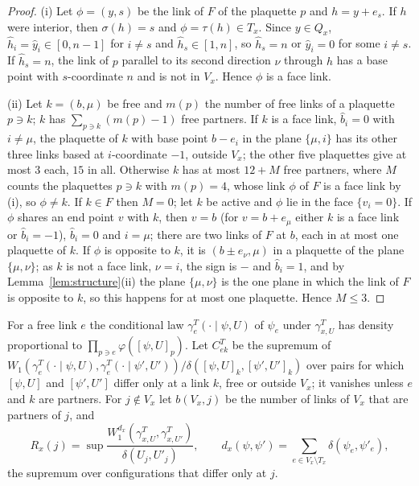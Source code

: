 \begin{proof}
(i) Let $\phi=(y,s)$ be the link of $F$ of the plaquette $p$ and $h=y+e_s$.
If $h$ were interior, then $\sigma(h)=s$ and $\phi=\tau(h)\in T_x$. Since $y\in
Q_x$, $\hat h_i=\hat y_i\in[0,n-1]$ for $i\ne s$ and $\hat h_s\in[1,n]$, so
$\hat h_s=n$ or $\hat y_i=0$ for some $i\ne s$. If $\hat h_s=n$, the link of
$p$ parallel to its second direction $\nu$ through $h$ has a base point with
$s$-coordinate $n$ and is not in $V_x$. Hence $\phi$ is a face link.

(ii) Let $k=(b,\mu)$ be free and $m(p)$ the number of free links of a
plaquette $p\ni k$; $k$ has $\sum_{p\ni k}(m(p)-1)$ free partners. If $k$ is a
face link, $\hat b_i=0$ with $i\ne\mu$, the plaquette of $k$ with base point
$b-e_i$ in the plane $\{\mu,i\}$ has its other three links based at
$i$-coordinate $-1$, outside $V_x$; the other five plaquettes give at most $3$
each, $15$ in all. Otherwise $k$ has at most $12+M$ free partners, where $M$
counts the plaquettes $p\ni k$ with $m(p)=4$, whose link $\phi$ of $F$ is a face
link by (i), so $\phi\ne k$. If $k\in F$ then $M=0$; let $k$ be active and
$\phi$ lie in the face $\{\hat v_i=0\}$. If $\phi$ shares an end point $v$ with
$k$, then $v=b$ (for $v=b+e_\mu$ either $k$ is a face link or $\hat b_i=-1$),
$\hat b_i=0$ and $i=\mu$; there are two links of $F$ at $b$, each in at most
one plaquette of $k$. If $\phi$ is opposite to $k$, it is $(b\pm e_\nu,\mu)$
in a plaquette of the plane $\{\mu,\nu\}$; as $k$ is not a face link, $\nu=i$,
the sign is $-$ and $\hat b_i=1$, and by Lemma~\ref{lem:structure}(ii) the
plane $\{\mu,\nu\}$ is the one plane in which the link of $F$ is opposite to
$k$, so this happens for at most one plaquette. Hence $M\le3$.
\end{proof}

For a free link $e$ the conditional law $\gamma^T_e(\cdot\mid\psi,U)$ of
$\psi_e$ under $\gamma^T_{x,U}$ has density proportional to $\prod_{p\ni e}
\varphi([\psi,U]_p)$. Let $C^T_{ek}$ be the supremum of $W_1(\gamma^T_e(\cdot
\mid\psi,U),\gamma^T_e(\cdot\mid\psi',U'))/\delta([\psi,U]_k,[\psi',U']_k)$ over
pairs for which $[\psi,U]$ and $[\psi',U']$ differ only at a link $k$, free or
outside $V_x$; it vanishes unless $e$ and $k$ are partners. For $j\notin V_x$
let $b(V_x,j)$ be the number of links of $V_x$ that are partners of $j$, and
\[
R_x(j)=\sup\frac{W_1^{d_x}(\gamma^T_{x,U},\gamma^T_{x,U'})}{\delta(U_j,U'_j)},
\qquad d_x(\psi,\psi')=\sum_{e\in V_x\setminus T_x}\delta(\psi_e,\psi'_e),
\]
the supremum over configurations that differ only at $j$.


